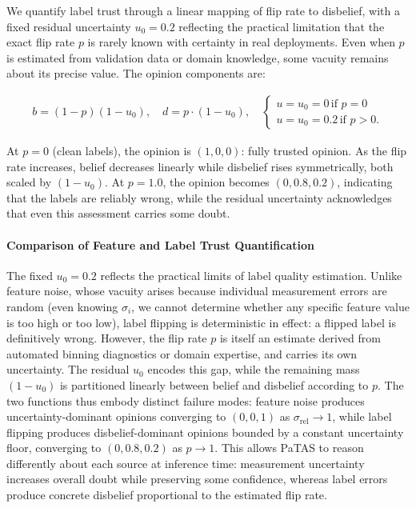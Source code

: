 We quantify label trust through a linear mapping of flip rate to disbelief, with a fixed residual uncertainty $u_0 = 0.2$ reflecting the practical limitation that the exact flip rate $p$ is rarely known with certainty in real deployments. Even when $p$ is estimated from validation data or domain knowledge, some vacuity remains about its precise value. The opinion components are:

\begin{align}
b = (1 - p)(1 - u_0), \quad d = p \cdot (1 - u_0), \quad 
\begin{cases}
    u = u_0 = 0 \, \text{if } p=0\\
    u = u_0 = 0.2 \, \text{if } p>0.
\end{cases}
\label{eq:label_bdu}
\end{align}

At $p = 0$ (clean labels), the opinion is $(1, 0, 0)$: fully trusted opinion. As the flip rate increases, belief decreases linearly while disbelief rises symmetrically, both scaled by $(1 - u_0)$. At $p = 1.0$, the opinion becomes $(0, 0.8, 0.2)$, indicating that the labels are reliably wrong, while the residual uncertainty acknowledges that even this assessment carries some doubt.
\paragraph{Comparison of Feature and Label Trust Quantification}
\label{sec:trust_comparison}
The fixed $u_0 = 0.2$ reflects the practical limits of label quality estimation. Unlike feature noise, whose vacuity arises because individual measurement errors are random (even knowing $\sigma_i$, we cannot determine whether any specific feature value is too high or too low), label flipping is deterministic in effect: a flipped label is definitively wrong. However, the flip rate $p$ is itself an estimate derived from automated binning diagnostics or domain expertise, and carries its own uncertainty. The residual $u_0$ encodes this gap, while the remaining mass $(1 - u_0)$ is partitioned linearly between belief and disbelief according to $p$. The two functions thus embody distinct failure modes: feature noise produces uncertainty-dominant opinions converging to $(0, 0, 1)$ as $\sigma_{\text{rel}} \to 1$, while label flipping produces disbelief-dominant opinions bounded by a constant uncertainty floor, converging to $(0, 0.8, 0.2)$ as $p \to 1$. This allows \ac{PaTAS} to reason differently about each source at inference time: measurement uncertainty increases overall doubt while preserving some confidence, whereas label errors produce concrete disbelief proportional to the estimated flip rate.

